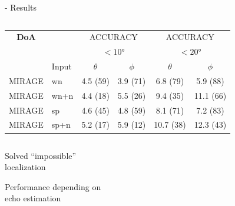 \begin{frame}{\mirage - Results}
\begin{columns}[T,onlytextwidth]
        \begin{column}{.74\textwidth}
            \centering
            \small
            \begin{tabular}{cl|cc|cc}
            \toprule
            \textbf{DoA}      &               &  \multicolumn{2}{c|}{ACCURACY} &   \multicolumn{2}{c}{ACCURACY} \\
                            &               &  \multicolumn{2}{c|}{$<\ang{10}$} &   \multicolumn{2}{c}{$<\ang{20}$} \\
                            &    Input    &  $\theta$ &  $\phi$ &  $\theta$ &  $\phi$ \\
            \midrule
            MIRAGE &  wn           &   4.5 (59) &  3.9 (71) &   6.8 (79) &   5.9 (88) \\
            MIRAGE &  wn+n     &   4.4 (18) &  5.5 (26) &   9.4 (35) &  11.1 (66) \\
            MIRAGE &  sp       &   4.6 (45) &  4.8 (59) &   8.1 (71) &   7.2 (83) \\
            MIRAGE &  sp+n &   5.2 (17) &  5.9 (12) &  10.7 (38) &  12.3 (43) \\
            \bottomrule
        \end{tabular}

        \end{column}

    \end{columns}

    \begin{center}
        \textcolor{mygreen}{\cmark \: \parbox{12em}{Solved ``impossible''\\localization}}
        \quad \textcolor{myred}{\xmark \: \parbox{12em}{Performance depending on\\echo estimation}}
    \end{center}

\end{frame}








